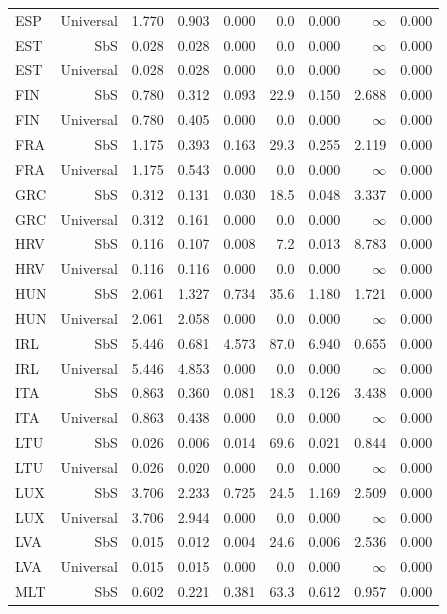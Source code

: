 {\begin{longtable}{@{}lrrrrrrrr@{}}
ESP & Universal & 1.770 & 0.903 & 0.000 &  0.0 & 0.000 & $\infty$ & 0.000 \\
EST & SbS & 0.028 & 0.028 & 0.000 &  0.0 & 0.000 & $\infty$ & 0.000 \\
EST & Universal & 0.028 & 0.028 & 0.000 &  0.0 & 0.000 & $\infty$ & 0.000 \\
FIN & SbS & 0.780 & 0.312 & 0.093 & 22.9 & 0.150 & 2.688 & 0.000 \\
FIN & Universal & 0.780 & 0.405 & 0.000 &  0.0 & 0.000 & $\infty$ & 0.000 \\
FRA & SbS & 1.175 & 0.393 & 0.163 & 29.3 & 0.255 & 2.119 & 0.000 \\
FRA & Universal & 1.175 & 0.543 & 0.000 &  0.0 & 0.000 & $\infty$ & 0.000 \\
GRC & SbS & 0.312 & 0.131 & 0.030 & 18.5 & 0.048 & 3.337 & 0.000 \\
GRC & Universal & 0.312 & 0.161 & 0.000 &  0.0 & 0.000 & $\infty$ & 0.000 \\
HRV & SbS & 0.116 & 0.107 & 0.008 &  7.2 & 0.013 & 8.783 & 0.000 \\
HRV & Universal & 0.116 & 0.116 & 0.000 &  0.0 & 0.000 & $\infty$ & 0.000 \\
HUN & SbS & 2.061 & 1.327 & 0.734 & 35.6 & 1.180 & 1.721 & 0.000 \\
HUN & Universal & 2.061 & 2.058 & 0.000 &  0.0 & 0.000 & $\infty$ & 0.000 \\
IRL & SbS & 5.446 & 0.681 & 4.573 & 87.0 & 6.940 & 0.655 & 0.000 \\
IRL & Universal & 5.446 & 4.853 & 0.000 &  0.0 & 0.000 & $\infty$ & 0.000 \\
ITA & SbS & 0.863 & 0.360 & 0.081 & 18.3 & 0.126 & 3.438 & 0.000 \\
ITA & Universal & 0.863 & 0.438 & 0.000 &  0.0 & 0.000 & $\infty$ & 0.000 \\
LTU & SbS & 0.026 & 0.006 & 0.014 & 69.6 & 0.021 & 0.844 & 0.000 \\
LTU & Universal & 0.026 & 0.020 & 0.000 &  0.0 & 0.000 & $\infty$ & 0.000 \\
LUX & SbS & 3.706 & 2.233 & 0.725 & 24.5 & 1.169 & 2.509 & 0.000 \\
LUX & Universal & 3.706 & 2.944 & 0.000 &  0.0 & 0.000 & $\infty$ & 0.000 \\
LVA & SbS & 0.015 & 0.012 & 0.004 & 24.6 & 0.006 & 2.536 & 0.000 \\
LVA & Universal & 0.015 & 0.015 & 0.000 &  0.0 & 0.000 & $\infty$ & 0.000 \\
MLT & SbS & 0.602 & 0.221 & 0.381 & 63.3 & 0.612 & 0.957 & 0.000 \\

\end{longtable}}
